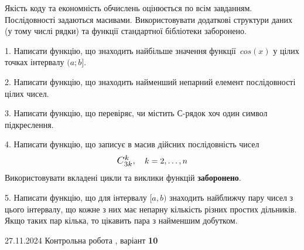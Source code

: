 \documentclass[12pt, ukrainian]{article}
\begin{document}
{{{{{{{{%

{
Якість коду та економність обчислень оцінюється по всім завданням. Послідовності задаються масивами. Використовувати додаткові структури даних (у тому числі рядки) та функції стандартної бібліотеки заборонено.

\vspace{2mm}

\begin {large}
1. Написати функцію, що знаходить найбільше значення функції~$cos(x)$ у цілих точках інтервалу $(a; b]$.

\vspace{2mm}


2. Написати функцію, що знаходить найменший непарний елемент послідовності цілих чисел.

\vspace{2mm}


3. Написати функцію, що перевіряє, чи містить С-рядок хоч один символ підкреслення.

\vspace{2mm}


4. 
Написати функцію, що записує в масив дійсних послідовність чисел
$$\scalebox{1.2}{$C_{3k}^{k}$}, \quad k=2,\ldots,n$$
Використовувати вкладені цикли та виклики функцій \textbf{заборонено}.

\vspace{2mm}


5. Написати функцію, що для інтервалу $[a, b)$ знаходить найближчу пару чисел з цього інтервалу, що кожне з них має непарну кількість різних простих дільників. Якщо таких пар кілька, то цікавить пара з найменшим добутком.

\vspace{2mm}

\end{large}
\vspace{35mm}


{{27.11.2024 Контрольна робота , варіант  \No \textbf { 10 }\par}}

}}}}}}}}}
\end{document}
